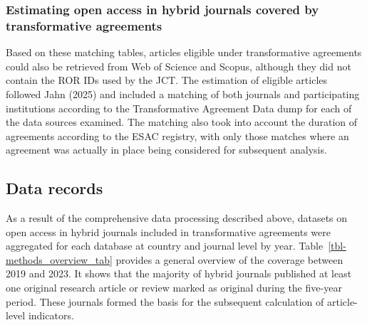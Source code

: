 \documentclass[a4paper,man,floatsintext,longtable,noextraspace,10pt]{apa6}
\begin{document}
\subsubsection{Estimating open access in hybrid journals covered by
transformative
agreements}\label{estimating-open-access-in-hybrid-journals-covered-by-transformative-agreements}

Based on these matching tables, articles eligible under transformative
agreements could also be retrieved from Web of Science and Scopus,
although they did not contain the ROR IDs used by the JCT. The
estimation of eligible articles followed Jahn (2025) and included a
matching of both journals and participating institutions according to
the Transformative Agreement Data dump for each of the data sources
examined. The matching also took into account the duration of agreements
according to the ESAC registry, with only those matches where an
agreement was actually in place being considered for subsequent
analysis.

\subsection{Data records}\label{data-records}

As a result of the comprehensive data processing described above,
datasets on open access in hybrid journals included in transformative
agreements were aggregated for each database at country and journal
level by year. Table~\ref{tbl-methods_overview_tab} provides a general
overview of the coverage between 2019 and 2023. It shows that the
majority of hybrid journals published at least one original research
article or review marked as original during the five-year period. These
journals formed the basis for the subsequent calculation of
article-level indicators.
\end{document}
